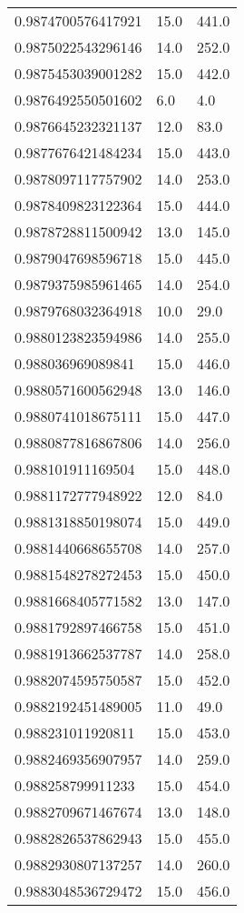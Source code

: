 \begin{center}
\begin{supertabular}[H]{p{0.30\textwidth}p{0.05\textwidth}p{0.05\textwidth}}
0.9874700576417921 & 15.0 & 441.0 \\ 
0.9875022543296146 & 14.0 & 252.0 \\ 
0.9875453039001282 & 15.0 & 442.0 \\ 
0.9876492550501602 & 6.0 & 4.0 \\ 
0.9876645232321137 & 12.0 & 83.0 \\ 
0.9877676421484234 & 15.0 & 443.0 \\ 
0.9878097117757902 & 14.0 & 253.0 \\ 
0.9878409823122364 & 15.0 & 444.0 \\ 
0.9878728811500942 & 13.0 & 145.0 \\ 
0.9879047698596718 & 15.0 & 445.0 \\ 
0.9879375985961465 & 14.0 & 254.0 \\ 
0.9879768032364918 & 10.0 & 29.0 \\ 
0.9880123823594986 & 14.0 & 255.0 \\ 
0.988036969089841 & 15.0 & 446.0 \\ 
0.9880571600562948 & 13.0 & 146.0 \\ 
0.9880741018675111 & 15.0 & 447.0 \\ 
0.9880877816867806 & 14.0 & 256.0 \\ 
0.988101911169504 & 15.0 & 448.0 \\ 
0.9881172777948922 & 12.0 & 84.0 \\ 
0.9881318850198074 & 15.0 & 449.0 \\ 
0.9881440668655708 & 14.0 & 257.0 \\ 
0.9881548278272453 & 15.0 & 450.0 \\ 
0.9881668405771582 & 13.0 & 147.0 \\ 
0.9881792897466758 & 15.0 & 451.0 \\ 
0.9881913662537787 & 14.0 & 258.0 \\ 
0.9882074595750587 & 15.0 & 452.0 \\ 
0.9882192451489005 & 11.0 & 49.0 \\ 
0.988231011920811 & 15.0 & 453.0 \\ 
0.9882469356907957 & 14.0 & 259.0 \\ 
0.988258799911233 & 15.0 & 454.0 \\ 
0.9882709671467674 & 13.0 & 148.0 \\ 
0.9882826537862943 & 15.0 & 455.0 \\ 
0.9882930807137257 & 14.0 & 260.0 \\ 
0.9883048536729472 & 15.0 & 456.0 \\ 

\end{supertabular}
\end{center}
